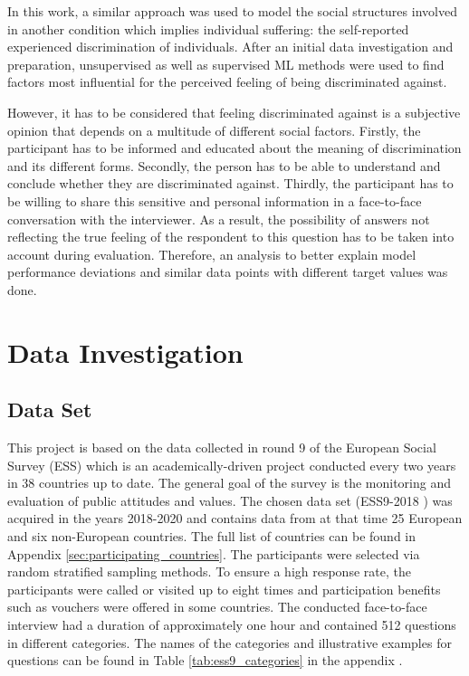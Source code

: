\documentclass[10pt]{article}
\begin{document}
	In this work, a similar approach was used to model the social structures involved in another condition which implies individual suffering: the self-reported experienced discrimination of individuals. After an initial data investigation and preparation, unsupervised as well as supervised ML methods were used to find factors most influential for the perceived feeling of being discriminated against.
	
	However, it has to be considered that feeling discriminated against is a subjective opinion that depends on a multitude of different social factors. Firstly, the participant has to be informed and educated about the meaning of discrimination and its different forms. Secondly, the person has to be able to understand and conclude whether they are discriminated against. Thirdly, the participant has to be willing to share this sensitive and personal information in a face-to-face conversation with the interviewer. As a result, the possibility of answers not reflecting the true feeling of the respondent to this question has to be taken into account during evaluation. Therefore, an analysis to better explain model performance deviations and similar data points with different target values was done. 
	
	
	\section{Data Investigation} %
	\subsection{Data Set} \label{sec:data_set}
	This project is based on the data collected in round 9 of the European Social Survey (ESS) which is an academically-driven project conducted every two years in 38 countries up to date. The general goal of the survey is the monitoring and evaluation of public attitudes and values.
	The chosen data set (ESS9-2018 \citep{ESS9:2021}) was acquired in the years 2018-2020 and contains data from at that time 25 European and six non-European countries. The full list of countries can be found in Appendix \ref{sec:participating_countries}. The participants were selected via random stratified sampling methods. To ensure a high response rate, the participants were called or visited up to eight times and participation benefits such as vouchers were offered in some countries. The conducted face-to-face interview had a duration of approximately one hour and contained 512 questions in different categories. The names of the categories and illustrative examples for questions can be found in Table \ref{tab:ess9_categories} in the appendix \cite{ESS9_data_documentation:2021}. 
	
\end{document}
